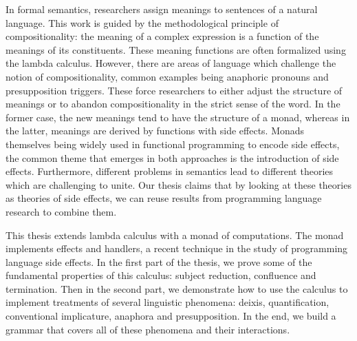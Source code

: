 \begin{ThesisAbstract}
  \begin{EnglishAbstract}
    In formal semantics, researchers assign meanings to sentences of a
    natural language. This work is guided by the methodological principle
    of compositionality: the meaning of a complex expression is a function
    of the meanings of its constituents. These meaning functions are often
    formalized using the lambda calculus. However, there are areas of
    language which challenge the notion of compositionality, common
    examples being anaphoric pronouns and presupposition triggers. These
    force researchers to either adjust the structure of meanings or to
    abandon compositionality in the strict sense of the word. In the former
    case, the new meanings tend to have the structure of a monad, whereas
    in the latter, meanings are derived by functions with side
    effects. Monads themselves being widely used in functional programming
    to encode side effects, the common theme that emerges in both
    approaches is the introduction of side effects. Furthermore, different
    problems in semantics lead to different theories which are challenging
    to unite. Our thesis claims that by looking at these theories as
    theories of side effects, we can reuse results from programming
    language research to combine them.

    This thesis extends lambda calculus with a monad of computations. The
    monad implements effects and handlers, a recent technique in the study
    of programming language side effects.  In the first part of the thesis,
    we prove some of the fundamental properties of this calculus: subject
    reduction, confluence and termination. Then in the second part, we
    demonstrate how to use the calculus to implement treatments of several
    linguistic phenomena: deixis, quantification, conventional implicature,
    anaphora and presupposition. In the end, we build a grammar that covers
    all of these phenomena and their interactions.

  \end{EnglishAbstract}
\end{ThesisAbstract}
